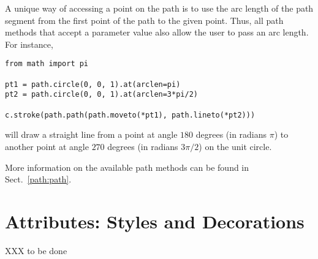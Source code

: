 A unique way of accessing a point on the path is to use the arc length
of the path segment from the first point of the path to the given
point. Thus, all \PyX{} path methods that accept a parameter value
also allow the user to pass an arc length. For instance, 
\begin{verbatim}
from math import pi

pt1 = path.circle(0, 0, 1).at(arclen=pi)
pt2 = path.circle(0, 0, 1).at(arclen=3*pi/2)

c.stroke(path.path(path.moveto(*pt1), path.lineto(*pt2)))
\end{verbatim}
will draw a straight line from a point at angle $180$ degrees (in
radians $\pi$) to another point at angle $270$ degrees (in radians
$3\pi/2$) on the unit circle.

More information on the available path methods can be found 
in Sect.~\ref{path:path}.

\section{Attributes: Styles and Decorations}

XXX to be done